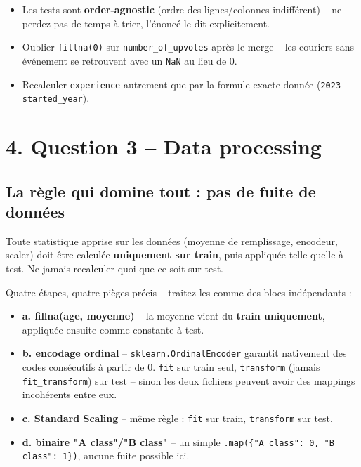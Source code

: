 \documentclass[11pt]{article}
\newcommand{\exhead}[1]{\subsection{#1}}
\begin{document}
\begin{trap}
\begin{itemize}[nosep]
  \item Les tests sont \textbf{order-agnostic} (ordre des lignes/colonnes
        indiff\'erent) -- ne perdez pas de temps \`a trier, l'\'enonc\'e le
        dit explicitement.
  \item Oublier \texttt{fillna(0)} sur \texttt{number\_of\_upvotes} apr\`es
        le merge -- les couriers sans \'ev\'enement se retrouvent avec
        un \texttt{NaN} au lieu de 0.
  \item Recalculer \texttt{experience} autrement que par la formule
        exacte donn\'ee (\texttt{2023 - started\_year}).
\end{itemize}
\end{trap}

\section{4. Question 3 -- Data processing}

\exhead{La r\`egle qui domine tout : pas de fuite de donn\'ees}
Toute statistique apprise sur les donn\'ees (moyenne de remplissage,
encodeur, scaler) doit \^etre calcul\'ee \textbf{uniquement sur train},
puis appliqu\'ee telle quelle \`a test. Ne jamais recalculer quoi que ce
soit sur test.

\begin{explik}
Quatre \'etapes, quatre pi\`eges pr\'ecis -- traitez-les comme des blocs
ind\'ependants :
\begin{itemize}[nosep]
  \item \textbf{a. fillna(age, moyenne)} -- la moyenne vient du
        \textbf{train uniquement}, appliqu\'ee ensuite comme constante \`a
        test.
  \item \textbf{b. encodage ordinal} -- \texttt{sklearn.OrdinalEncoder}
        garantit nativement des codes cons\'ecutifs \`a partir de 0.
        \texttt{fit} sur train seul, \texttt{transform} (jamais
        \texttt{fit\_transform}) sur test -- sinon les deux fichiers
        peuvent avoir des mappings incoh\'erents entre eux.
  \item \textbf{c. Standard Scaling} -- m\^eme r\`egle : \texttt{fit} sur
        train, \texttt{transform} sur test.
  \item \textbf{d. binaire "A class"/"B class"} -- un simple
        \texttt{.map(\{"A class": 0, "B class": 1\})}, aucune fuite
        possible ici.
\end{itemize}
\end{explik}
\end{document}
